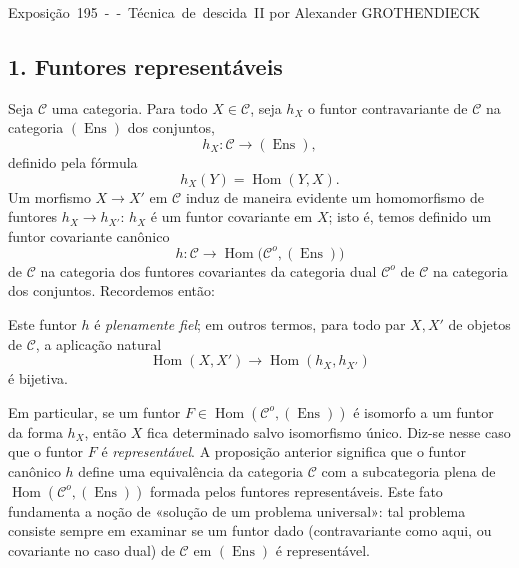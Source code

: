 \unit{Exposição 195 -- Técnica de descida II}
%
  {por Alexander GROTHENDIECK}


\subsection*{1. Funtores representáveis}

Seja $\mathcal C$ uma categoria. Para todo $X\in\mathcal C$, seja $h_X$ o
funtor contravariante de $\mathcal C$ na categoria $(\operatorname{Ens})$
dos conjuntos,
\[
  h_X:\mathcal C\longrightarrow(\operatorname{Ens}),
\]
definido pela fórmula
\[
  h_X(Y)=\operatorname{Hom}(Y,X).
\]
Um morfismo $X\longrightarrow X'$ em $\mathcal C$ induz de maneira evidente um
homomorfismo de funtores $h_X\longrightarrow h_{X'}$: $h_X$ é um funtor
covariante em $X$; isto é, temos definido um funtor covariante canônico
\[
  h:\mathcal C\longrightarrow
  \operatorname{Hom}\bigl(\mathcal C^o,(\operatorname{Ens})\bigr)
\]
de $\mathcal C$ na categoria dos funtores covariantes da categoria dual
$\mathcal C^o$ de $\mathcal C$ na categoria dos conjuntos. Recordemos
então:

 Este funtor $h$ é \emph{plenamente fiel}; em outros
termos, para todo par $X,X'$ de objetos de $\mathcal C$, a aplicação
natural
\[
  \operatorname{Hom}(X,X')\longrightarrow
  \operatorname{Hom}(h_X,h_{X'})
\]
é bijetiva.

Em particular, se um funtor
$F\in\operatorname{Hom}(\mathcal C^o,(\operatorname{Ens}))$ é isomorfo a um
funtor da forma $h_X$, então $X$ fica determinado salvo isomorfismo
único. Diz-se nesse caso que o funtor $F$ é \emph{representável}. A
proposição anterior significa que o funtor canônico $h$ define uma
equivalência da categoria $\mathcal C$ com a subcategoria plena de
$\operatorname{Hom}(\mathcal C^o,(\operatorname{Ens}))$ formada pelos
funtores representáveis. Este fato fundamenta a noção de «solução de um
problema universal»: tal problema consiste sempre em examinar se um funtor
dado (contravariante como aqui, ou covariante no caso dual) de $\mathcal C$
em $(\operatorname{Ens})$ é representável.

